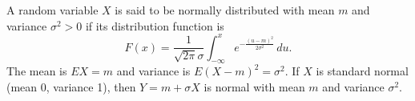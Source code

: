 A random variable $X$ is said to be normally distributed with mean $m$ and variance $\sigma^2 > 0$ if its distribution function is
$$F(x) = \frac{1}{\sqrt{2\pi} \sigma} \int_{-\infty}^{x} e^{-\frac{(u-m)^2}{2\sigma^2}} \, du.$$
The mean is $EX = m$ and variance is $E(X-m)^2 = \sigma^2$. If $X$ is standard normal (mean 0, variance 1), then $Y = m + \sigma X$ is normal with mean $m$ and variance $\sigma^2$.

